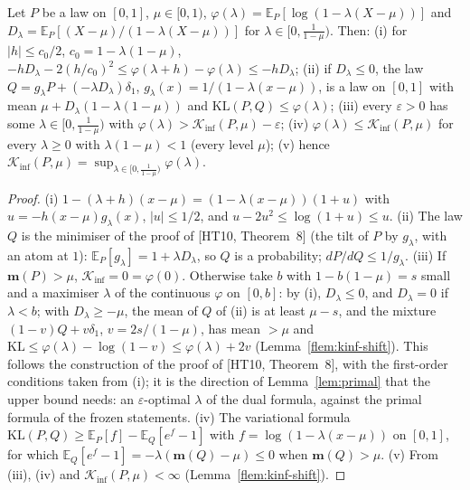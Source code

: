 \documentclass[11pt]{article}
\newcommand{\E}{\mathbb{E}}
\newcommand{\KL}{\mathrm{KL}}
\newcommand{\Kinf}{\mathcal K_{\inf}}
\begin{document}
\begin{lemma}[the primal and dual formulas of $\Kinf$]\label{flem:primal}
Let $P$ be a law on $[0,1]$, $\mu\in[0,1)$, $\varphi(\lambda)=\E_P[\log(1-\lambda(X-\mu))]$ and
$D_\lambda=\E_P[(X-\mu)/(1-\lambda(X-\mu))]$ for $\lambda\in[0,\frac1{1-\mu})$. Then:
(i) for $|h|\le c_0/2$, $c_0=1-\lambda(1-\mu)$, $-hD_\lambda-2(h/c_0)^2\le\varphi(\lambda+h)-\varphi(\lambda)\le-hD_\lambda$;
(ii) if $D_\lambda\le0$, the law $Q=g_\lambda P+(-\lambda D_\lambda)\delta_1$, $g_\lambda(x)=1/(1-\lambda(x-\mu))$, is a law on
$[0,1]$ with mean $\mu+D_\lambda(1-\lambda(1-\mu))$ and $\KL(P,Q)\le\varphi(\lambda)$;
(iii) every $\varepsilon>0$ has some $\lambda\in[0,\frac1{1-\mu})$ with $\varphi(\lambda)>\Kinf(P,\mu)-\varepsilon$;
(iv) $\varphi(\lambda)\le\Kinf(P,\mu)$ for every $\lambda\ge0$ with $\lambda(1-\mu)<1$ (every level $\mu$);
(v) hence $\Kinf(P,\mu)=\sup_{\lambda\in[0,\frac1{1-\mu})}\varphi(\lambda)$.
\end{lemma}

\begin{proof}
(i) $1-(\lambda+h)(x-\mu)=(1-\lambda(x-\mu))(1+u)$ with $u=-h(x-\mu)g_\lambda(x)$, $|u|\le1/2$, and
$u-2u^2\le\log(1+u)\le u$. (ii) The law $Q$ is the minimiser of the proof of [HT10, Theorem~8] (the tilt of $P$
by $g_\lambda$, with an atom at $1$): $\E_P[g_\lambda]=1+\lambda D_\lambda$, so $Q$ is a probability; $dP/dQ\le1/g_\lambda$. (iii) If
$\mathbf m(P)>\mu$, $\Kinf=0=\varphi(0)$. Otherwise take $b$ with $1-b(1-\mu)=s$ small and a maximiser $\lambda$ of the
continuous $\varphi$ on $[0,b]$: by (i), $D_\lambda\le0$, and $D_\lambda=0$ if $\lambda<b$; with $D_\lambda\ge-\mu$, the mean of $Q$
of (ii) is at least $\mu-s$, and the mixture $(1-v)Q+v\delta_1$, $v=2s/(1-\mu)$, has mean $>\mu$ and
$\KL\le\varphi(\lambda)-\log(1-v)\le\varphi(\lambda)+2v$ (Lemma~\ref{flem:kinf-shift}). This follows the construction
of the proof of [HT10, Theorem~8], with the first-order conditions taken from (i); it is the direction of
Lemma~\ref{lem:primal} that the upper bound needs: an $\varepsilon$-optimal $\lambda$ of the dual formula, against the
primal formula of the frozen statements. (iv) The variational formula
$\KL(P,Q)\ge\E_P[f]-\E_Q[e^f-1]$ with $f=\log(1-\lambda(x-\mu))$ on $[0,1]$, for which
$\E_Q[e^f-1]=-\lambda(\mathbf m(Q)-\mu)\le0$ when $\mathbf m(Q)>\mu$. (v) From (iii), (iv) and
$\Kinf(P,\mu)<\infty$ (Lemma~\ref{flem:kinf-shift}).
\end{proof}
\end{document}
